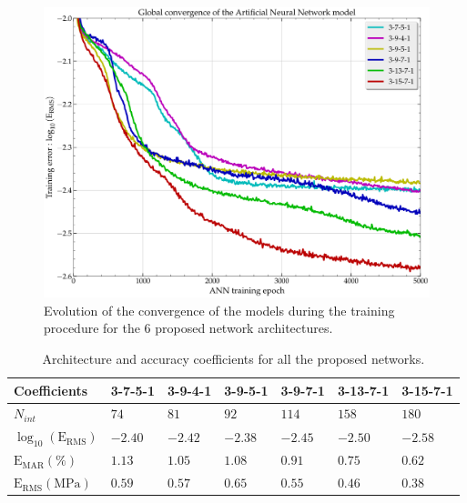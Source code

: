 \documentclass[metals,article,submit,pdftex,moreauthors]{Definitions/mdpi}
\DeclareRobustCommand{\RMSE}{\text{E}_\text{RMS}}
\DeclareRobustCommand{\MARE}{\text{E}_\text{MAR}}
\DeclareRobustCommand{\MPa}{\text{MPa}}
\begin{document}
\begin{figure}[H]
\centering
\includegraphics[width=0.7\columnwidth]{Figures/Conv-ANN-6}
\caption{Evolution of the convergence of the models during the training procedure for the 6 proposed network architectures.}
\label{fig:ANN-conv}
\end{figure}

\begin{table}[H]
\caption{Architecture and accuracy coefficients for all the proposed networks.}
\begin{tabularx}{\textwidth}{LCCCCCC}
\toprule
\textbf{Coefficients} & \textbf{3-7-5-1} & \textbf{3-9-4-1} & \textbf{3-9-5-1} & \textbf{3-9-7-1} & \textbf{3-13-7-1} & \textbf{3-15-7-1} \\
\toprule
$N_{int}$ & $74$ & $81$ & $92$ & $114$ & $158$ &$180$\\
\hline
$\log_{10}(\RMSE)$ & $-2.40$ & $-2.42$ & $-2.38$ & $-2.45$ & $-2.50$ & $-2.58$ \\
$\MARE(\%)$ & $1.13$ & $1.05$ & $1.08$ & $0.91$ & $0.75$ & $0.62$ \\
$\RMSE(\MPa)$ & $0.59$ & $0.57$ & $0.65$ & $0.55$ & $0.46$ & $0.38$ \\
\bottomrule
\end{tabularx}
\label{tab:Errors}
\end{table}
\end{document}
